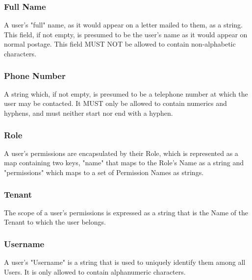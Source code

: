 \subsubsection{Full Name}
A user's "full" name, as it would appear on a letter mailed to them, as a string.
This field, if not empty, is presumed to be the user's name as it would appear on
normal postage. This field MUST NOT be allowed to contain non-alphabetic
characters.

\subsubsection{Phone Number}
A string which, if not empty, is presumed to be a telephone number at which the
user may be contacted. It MUST only be allowed to contain numerics and hyphens,
and must neither start nor end with a hyphen.

\subsubsection{Role}
A user's permissions are encapsulated by their Role, which is represented as a
map containing two keys, "name" that maps to the Role's Name as a string and
"permissions" which maps to a set of Permission Names as strings.

\subsubsection{Tenant}
The scope of a user's permissions is expressed as a string that is the Name of
the Tenant to which the user belongs.

\subsubsection{Username}
A user's "Username" is a string that is used to uniquely identify them among all
Users. It is only allowed to contain alphanumeric characters.
